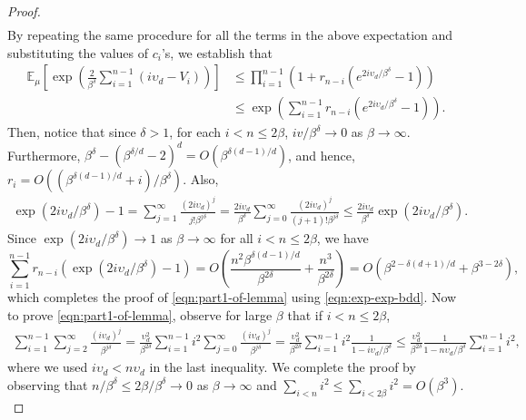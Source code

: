 \documentclass[10pt,a4paper]{amsart}
\newcommand{\ee}{\mathbb{E}}
\newcommand{\lt}{\left}
\newcommand{\rt}{\right}
\begin{document}
\begin{proof}
\begin{align*}
\end{align*}
By repeating the same procedure for all the terms in the above expectation and substituting the values of $c_i$'s, we establish that 
\begin{align}
\ee_\mu\lt[\exp\lt(\frac{2}{\beta^{\delta}}  \sum_{i =1}^{n-1} (i\upsilon_d - V_i)\rt)\rt] 
&\leq \prod_{i = 1}^{n-1}\lt(1 + r_{n-i} (e^{2i \upsilon_d/\beta^{\delta}} -1) \rt)\nonumber\\
&\leq \exp\lt( \sum_{i = 1}^{n-1} r_{n-i} (e^{2i \upsilon_d/\beta^{\delta}} -1) \rt). 
\label{eqn:exp-exp-bdd}
\end{align}
Then, notice that since $\delta > 1$, for each $i < n \leq 2\beta$, $iv/\beta^{\delta} \to 0$ as $\beta \to \infty$. Furthermore, 
 $\beta^{\delta} - (\beta^{\delta/d} - 2)^d = O(\beta^{\delta(d -1)/d})$, and hence,  
$r_i = O\lt((\beta^{\delta(d-1)/d} + i)/\beta^{\delta}\rt)$.
Also,
\begin{align*}
    \exp(2i \upsilon_d/\beta^{\delta}) -1 = \sum_{j=1}^\infty \frac{(2i \upsilon_d)^j}{j!\beta^{j\delta}} = \frac{2i\upsilon_d}{\beta^{\delta}} \sum_{j=0}^\infty \frac{(2i \upsilon_d)^j}{(j+1)!\beta^{j\delta}} \leq \frac{2i\upsilon_d}{\beta^{\delta}} \exp(2i \upsilon_d/\beta^{\delta}).
\end{align*}
Since $\exp(2i \upsilon_d/\beta^{\delta}) \to 1$ as $\beta \to \infty$ for all $i < n \leq 2\beta$, we have
\[
\sum_{i = 1}^{n-1} r_{n-i} (\exp(2i \upsilon_d/\beta^{\delta}) -1) = O\lt(\frac{n^2\beta^{\delta(d-1)/d}}{\beta^{2\delta}} + \frac{n^3}{\beta^{2\delta}} \rt) = O\lt(\beta^{2 - {\delta(d+1)/d}} + \beta^{3 - 2\delta} \rt),
\]
which completes the proof of \eqref{eqn:part1-of-lemma} using \eqref{eqn:exp-exp-bdd}.
Now to prove \eqref{eqn:part1-of-lemma}, observe for large $\beta$ that if $i < n \leq 2\beta$, 
\begin{align*}
    \sum_{i = 1}^{n -1} \sum_{j = 2}^\infty \frac{(i\upsilon_d)^j}{\beta^{j\delta}} 
    = \frac{\upsilon_d^2}{\beta^{2\delta}} \sum_{i = 1}^{n -1} i^2 \sum_{j = 0}^\infty \frac{(i\upsilon_d)^j}{\beta^{j\delta}} 
    = \frac{\upsilon_d^2}{\beta^{2\delta}} \sum_{i = 1}^{n -1} i^2 \frac{1}{1 - i\upsilon_d/\beta^{\delta}}
    \leq \frac{\upsilon_d^2}{\beta^{2\delta}} \frac{1}{1 - n\upsilon_d/\beta^{\delta}}\sum_{i = 1}^{n -1} i^2,
\end{align*}
where we used $i\upsilon_d < n\upsilon_d$ in the last inequality.
We complete the proof by observing that $n/\beta^\delta \leq 2\beta/\beta^\delta \to 0$ as $\beta \to \infty$ and 
$\sum_{i < n} i^2 \leq \sum_{i < 2\beta} i^2 = O(\beta^3).$
\end{proof}
\end{document}
